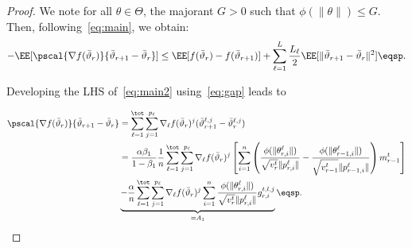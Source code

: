\documentclass[twoside]{article}
\begin{document}
\begin{proof}
 We note for all $\theta \in \Theta$, the majorant $G > 0$ such that $\phi(\|\theta \|) \leq G$. 
 Then, following~\eqref{eq:main}, we obtain:
 \begin{align}\label{eq:main2}
 - \EE[  \pscal{\nabla f(\bar{\vartheta}_r)}{\bar{\vartheta}_{r+1} - \bar{\vartheta}_r}]  \leq  \EE[ f(\bar{\vartheta}_r) - f(\bar{\vartheta}_{r+1})] + \sum_{\ell =1}^L \frac{L_\ell}{2} \EE[  \| \bar{\vartheta}_{r+1} - \bar{\vartheta}_r \|^2] \eqsp.
 \end{align}

 Developing the LHS of~\eqref{eq:main2} using~\eqref{eq:gap} leads to

 \begin{align}\label{eq:inner}
 \pscal{\nabla f(\bar{\vartheta}_r)}{\bar{\vartheta}_{r+1} - \bar{\vartheta}_r} &= \sum_{\ell=1}^\tot \sum_{j=1}^{p_\ell} \nabla_{\ell} f(\bar{\vartheta}_r)^j (\bar{\vartheta}^{\ell,j}_{r+1} - \bar{\vartheta}^{\ell,j}_r) \\
 & =  \frac{\alpha \beta_1}{1-\beta_1}\frac{1}{n}  \sum_{\ell=1}^\tot \sum_{j=1}^{p_\ell} \nabla_{\ell} f(\bar{\vartheta}_r)^j \left[   \sum_{i = 1}^n  \left( \frac{\phi(\|\theta_{r,i}^{\ell}\|)}{\sqrt{v^{t}_{r}} \|p_{r,i}^{\ell}\|} - \frac{\phi(\|\theta_{r-1,i}^{\ell}\|)}{\sqrt{v^{t}_{r-1}} \|p_{r-1,i}^{\ell}\|} \right) m^{t}_{r-1}  \right] \\
 & \underbrace{ -\frac{\alpha}{n} \sum_{\ell=1}^\tot \sum_{j=1}^{p_\ell} \nabla_{\ell} f(\bar{\vartheta}_r)^j  \sum_{i = 1}^n \frac{\phi(\|\theta_{r,i}^{\ell}\|)}{\sqrt{v^{t}_{r}} \|p_{r,i}^{\ell}\|} g_{r,i}^{t,l,j}}_{= A_1}   \label{eqn1} \eqsp.
 \end{align}




\end{proof}
\end{document}
